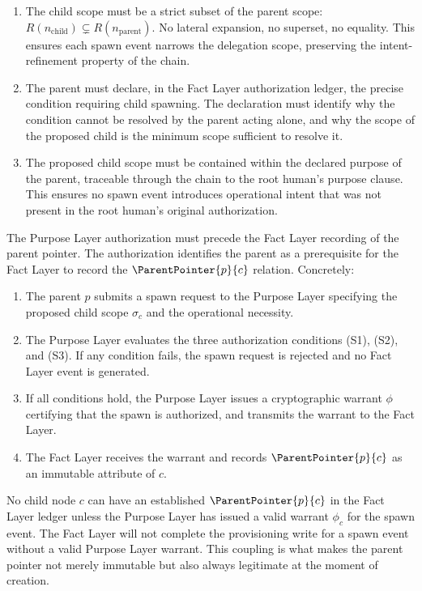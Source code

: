 \begin{enumerate}
    \item[(S1) \textbf{Scope refinement.}] The child scope must be a strict subset of the parent scope: $R(n_{\mathrm{child}}) \subsetneq R(n_{\mathrm{parent}})$. No lateral expansion, no superset, no equality. This ensures each spawn event narrows the delegation scope, preserving the intent-refinement property of the chain.

    \item[(S2) \textbf{Operational necessity.}] The parent must declare, in the Fact Layer authorization ledger, the precise condition requiring child spawning. The declaration must identify why the condition cannot be resolved by the parent acting alone, and why the scope of the proposed child is the minimum scope sufficient to resolve it.

    \item[(S3) \textbf{Human intent alignment.}] The proposed child scope must be contained within the declared purpose of the parent, traceable through the chain to the root human's purpose clause. This ensures no spawn event introduces operational intent that was not present in the root human's original authorization.
\end{enumerate}

The Purpose Layer authorization must precede the Fact Layer recording of the parent pointer. The authorization identifies the parent as a prerequisite for the Fact Layer to record the $\ParentPointer{p}{c}$ relation. Concretely:

\begin{enumerate}
    \item The parent $p$ submits a spawn request to the Purpose Layer specifying the proposed child scope $\sigma_c$ and the operational necessity.
    \item The Purpose Layer evaluates the three authorization conditions (S1), (S2), and (S3). If any condition fails, the spawn request is rejected and no Fact Layer event is generated.
    \item If all conditions hold, the Purpose Layer issues a cryptographic warrant $\phi$ certifying that the spawn is authorized, and transmits the warrant to the Fact Layer.
    \item The Fact Layer receives the warrant and records $\ParentPointer{p}{c}$ as an immutable attribute of $c$.
\end{enumerate}

No child node $c$ can have an established $\ParentPointer{p}{c}$ in the Fact Layer ledger unless the Purpose Layer has issued a valid warrant $\phi_c$ for the spawn event. The Fact Layer will not complete the provisioning write for a spawn event without a valid Purpose Layer warrant. This coupling is what makes the parent pointer not merely immutable but also always legitimate at the moment of creation.

